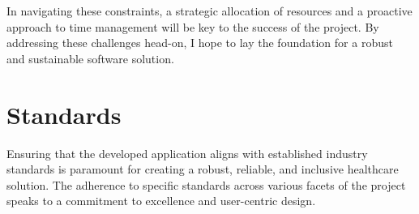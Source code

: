 In navigating these constraints, a strategic allocation of resources and a proactive approach to time management will be key to the success of the project. By addressing these challenges head-on, I hope to lay the foundation for a robust and sustainable software solution.

\section{Standards}

Ensuring that the developed application aligns with established industry standards is paramount for creating a robust, reliable, and inclusive healthcare solution. The adherence to specific standards across various facets of the project speaks to a commitment to excellence and user-centric design.

